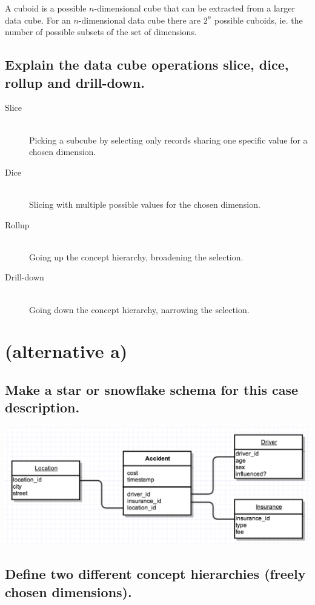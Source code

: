 \documentclass[11pt,a4paper]{article}
\begin{document}
A cuboid is a possible $n$-dimensional cube that can be extracted from a larger data cube. For an $n$-dimensional data cube there are $2^n$ possible cuboids, ie. the number of possible subsets of the set of dimensions.


\subsection{Explain the data cube operations slice, dice, rollup and drill-down.}

\begin{description}
  \item[Slice] \hfill \\ Picking a subcube by selecting only records sharing one specific value for a chosen dimension.
  \item[Dice] \hfill \\ Slicing with multiple possible values for the chosen dimension.
  \item[Rollup] \hfill \\ Going up the concept hierarchy, broadening the selection.
  \item[Drill-down] \hfill \\ Going down the concept hierarchy, narrowing the selection.
\end{description}

\section{(alternative a)} %

\subsection{Make a star or snowflake schema for this case description.}

\includegraphics[width=\textwidth]{ex2a}

\subsection{Define two different concept hierarchies (freely chosen dimensions).}
\end{document}
